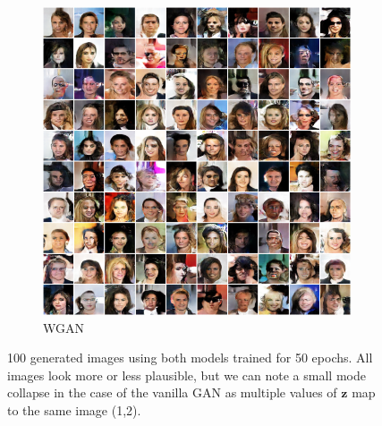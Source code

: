 \documentclass[table]{article}
\def\*#1{\mathbf{#1}}
\begin{document}
\begin{figure}[ht]
  \vspace*{3mm}
  \begin{subfigure}{\textwidth}
    \centering
    \includegraphics[scale=0.38]{imgs/wgan_epoch50}
    \caption{WGAN}
  \end{subfigure}
  \caption{100 generated images using both models trained for 50 epochs. All images look more or less plausible, but we can note a small mode collapse in the case of the vanilla GAN as multiple values of $\*z$ map to the same image (1,2). }
\end{figure}
\end{document}
